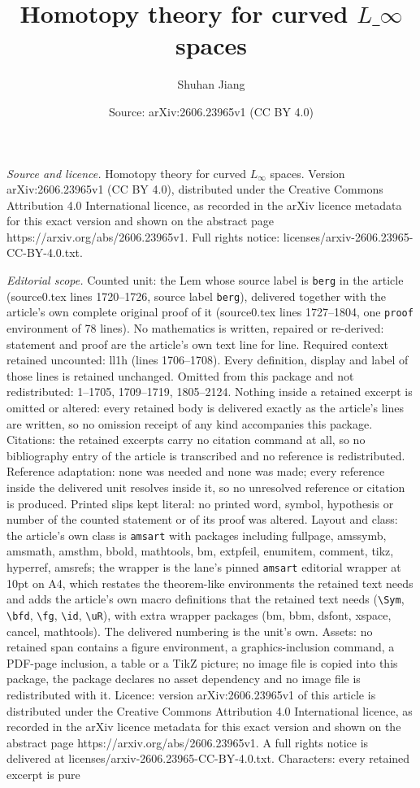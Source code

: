 \documentclass[10pt,a4paper]{amsart}
\title[Homotopy theory for curved $L\_\infty$ spaces]{Homotopy theory for curved $L\_\infty$ spaces}
\author{Shuhan Jiang}
\date{Source: arXiv:2606.23965v1 (CC BY 4.0)}
\begin{document}
\maketitle

\noindent\emph{Source and licence.} Homotopy theory for curved $L_\infty$ spaces. Version arXiv:2606.23965v1 (CC BY 4.0), distributed under the Creative Commons Attribution 4.0 International licence, as recorded in the arXiv licence metadata for this exact version and shown on the abstract page https://arxiv.org/abs/2606.23965v1. Full rights notice: licenses/arxiv-2606.23965-CC-BY-4.0.txt.\par\smallskip

\noindent\textit{Editorial scope.} Counted unit: the Lem whose source label is \texttt{berg} in the article (source0.tex lines 1720--1726, source label \texttt{berg}), delivered together with the article's own complete original proof of it (source0.tex lines 1727--1804, one \texttt{proof} environment of 78 lines). No mathematics is written, repaired or re-derived: statement and proof are the article's own text line for line. Required context retained uncounted: ll1h (lines 1706--1708). Every definition, display and label of those lines is retained unchanged. Omitted from this package and not redistributed: 1--1705, 1709--1719, 1805--2124. Nothing inside a retained excerpt is omitted or altered: every retained body is delivered exactly as the article's lines are written, so no omission receipt of any kind accompanies this package. Citations: the retained excerpts carry no citation command at all, so no bibliography entry of the article is transcribed and no reference is redistributed. Reference adaptation: none was needed and none was made; every reference inside the delivered unit resolves inside it, so no unresolved reference or citation is produced. Printed slips kept literal: no printed word, symbol, hypothesis or number of the counted statement or of its proof was altered. Layout and class: the article's own class is \texttt{amsart} with packages including fullpage, amssymb, amsmath, amsthm, bbold, mathtools, bm, extpfeil, enumitem, comment, tikz, hyperref, amsrefs; the wrapper is the lane's pinned \texttt{amsart} editorial wrapper at 10pt on A4, which restates the theorem-like environments the retained text needs and adds the article's own macro definitions that the retained text needs (\texttt{\textbackslash Sym}, \texttt{\textbackslash bfd}, \texttt{\textbackslash fg}, \texttt{\textbackslash id}, \texttt{\textbackslash uR}), with extra wrapper packages (bm, bbm, dsfont, xspace, cancel, mathtools). The delivered numbering is the unit's own. Assets: no retained span contains a figure environment, a graphics-inclusion command, a PDF-page inclusion, a table or a TikZ picture; no image file is copied into this package, the package declares no asset dependency and no image file is redistributed with it. Licence: version arXiv:2606.23965v1 of this article is distributed under the Creative Commons Attribution 4.0 International licence, as recorded in the arXiv licence metadata for this exact version and shown on the abstract page https://arxiv.org/abs/2606.23965v1. A full rights notice is delivered at licenses/arxiv-2606.23965-CC-BY-4.0.txt. Characters: every retained excerpt is pure 
\end{document}
